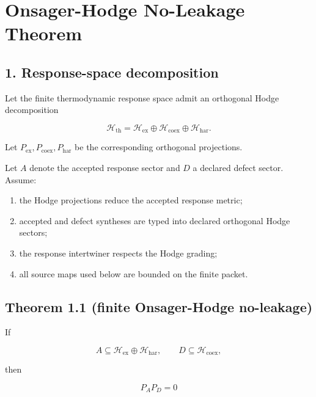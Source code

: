 \hypertarget{onsager-hodge-no-leakage-theorem}{%
\chapter{Onsager-Hodge No-Leakage Theorem}\label{onsager-hodge-no-leakage-theorem}}

\hypertarget{response-space-decomposition}{%
\section{1. Response-space decomposition}\label{response-space-decomposition}}

Let the finite thermodynamic response space admit an orthogonal Hodge decomposition

\[
\mathcal H_{\mathrm{th}}
=
\mathcal H_{\mathrm{ex}}
\oplus
\mathcal H_{\mathrm{coex}}
\oplus
\mathcal H_{\mathrm{har}}.
\]

Let \(P_{\mathrm{ex}},P_{\mathrm{coex}},P_{\mathrm{har}}\) be the corresponding orthogonal projections.

Let \(A\) denote the accepted response sector and \(D\) a declared defect sector. Assume:

\begin{enumerate}
\def\labelenumi{\arabic{enumi}.}
\tightlist
\item
  the Hodge projections reduce the accepted response metric;
\item
  accepted and defect syntheses are typed into declared orthogonal Hodge sectors;
\item
  the response intertwiner respects the Hodge grading;
\item
  all source maps used below are bounded on the finite packet.
\end{enumerate}

\hypertarget{theorem-1.1-finite-onsager-hodge-no-leakage}{%
\section{Theorem 1.1 (finite Onsager-Hodge no-leakage)}\label{theorem-1.1-finite-onsager-hodge-no-leakage}}

If

\[
A\subseteq\mathcal H_{\mathrm{ex}}\oplus\mathcal H_{\mathrm{har}},
\qquad
D\subseteq\mathcal H_{\mathrm{coex}},
\]

then

\[
\boxed{P_A P_D=0}
\]

